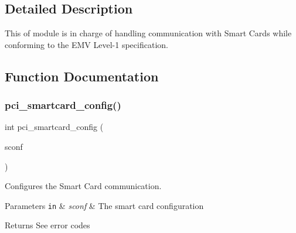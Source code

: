 \subsection{Detailed Description}
This of module is in charge of handling communication with Smart Cards while conforming to the E\+MV Level-\/1 specification.

\subsection{Function Documentation}
\hypertarget{group__pcibx__sc_gac227636b4a270677ea489d54bfa9262e}{}\label{group__pcibx__sc_gac227636b4a270677ea489d54bfa9262e}
\subsubsection{\texorpdfstring{pci\+\_\+smartcard\+\_\+config()}{pci\_smartcard\_config()}}
{\footnotesize\ttfamily int pci\+\_\+smartcard\+\_\+config (\begin{DoxyParamCaption}\item[{S\+C\+A\+R\+D\+\_\+\+C\+O\+NF}]{sconf }\end{DoxyParamCaption})}



Configures the Smart Card communication.


\begin{DoxyParams}[1]{Parameters}
\mbox{\tt in}  & {\em sconf} & The smart card configuration\\
\hline
\end{DoxyParams}
\begin{DoxyReturn}{Returns}
See error codes
\end{DoxyReturn}
\hypertarget{group__pcibx__sc_gaa97512bc1e0389c8528b90e2d2d05ad0}{}\label{group__pcibx__sc_gaa97512bc1e0389c8528b90e2d2d05ad0}

